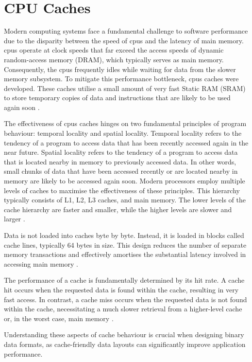 \section{CPU Caches}
\label{tb:cache}
Modern computing systems face a fundamental challenge to software performance due to the disparity between the speed of \acp{cpu} and the latency of main memory. \acp{cpu} operate at clock speeds that far exceed the access speeds of dynamic random-access memory (DRAM), which typically serves as main memory. Consequently, the \acp{cpu} frequently idles while waiting for data from the slower memory subsystem. To mitigate this performance bottleneck, \acp{cpu} caches were developed. These caches utilise a small amount of very fast Static RAM (SRAM) to store temporary copies of data and instructions that are likely to be used again soon \citep{drepper_2007}.

The effectiveness of \acp{cpu} caches hinges on two fundamental principles of program behaviour: temporal locality and spatial locality. Temporal locality refers to the tendency of a program to access data that has been recently accessed again in the near future. Spatial locality refers to the tendency of a program to access data that is located nearby in memory to previously accessed data. In other words, small chunks of data that have been accessed recently or are located nearby in memory are likely to be accessed again soon. Modern processors employ multiple levels of caches to maximise the effectiveness of these principles. This hierarchy typically consists of L1, L2, L3 caches, and main memory. The lower levels of the cache hierarchy are faster and smaller, while the higher levels are slower and larger \citep{drepper_2007}.

Data is not loaded into caches byte by byte. Instead, it is loaded in blocks called cache lines, typically 64 bytes in size. This design reduces the number of separate memory transactions and effectively amortises the substantial latency involved in accessing main memory \citep{drepper_2007}.

The performance of a cache is fundamentally determined by its hit rate. A cache hit occurs when the requested data is found within the cache, resulting in very fast access. In contrast, a cache miss occurs when the requested data is not found within the cache, necessitating a much slower retrieval from a higher-level cache or, in the worst case, main memory \citep{abayomi_2020}.

Understanding these aspects of cache behaviour is crucial when designing binary data formats, as cache-friendly data layouts can significantly improve application performance.


